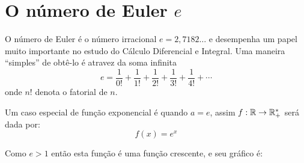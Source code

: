 \section{O número de Euler \texorpdfstring{$e$}{e}}

O número de Euler é o número irracional $e=2,7182\dots$ e desempenha um papel muito importante no estudo do Cálculo Diferencial e Integral. Uma maneira ``simples'' de obtê-lo é atravez da soma infinita
\begin{equation*}
    e = \dfrac{1}{0!}+\dfrac{1}{1!}+\dfrac{1}{2!}+\dfrac{1}{3!}+\dfrac{1}{4!}+\cdots
\end{equation*}
onde $n!$ denota o fatorial de $n$.


  \begin{exem} \label{ex:exp-e}
  Um caso especial de função exponencial é quando $a= e$, assim $f: \mathbb{R} \rightarrow \mathbb{R}_{+}^{*}$ será dada por:
\begin{equation*}
f(x) = e^x
\end{equation*}
  
  Como  $e>1$ então esta função é uma função crescente, e seu gráfico é:

\begin{center}
    \end{center}

  \end{exem}



